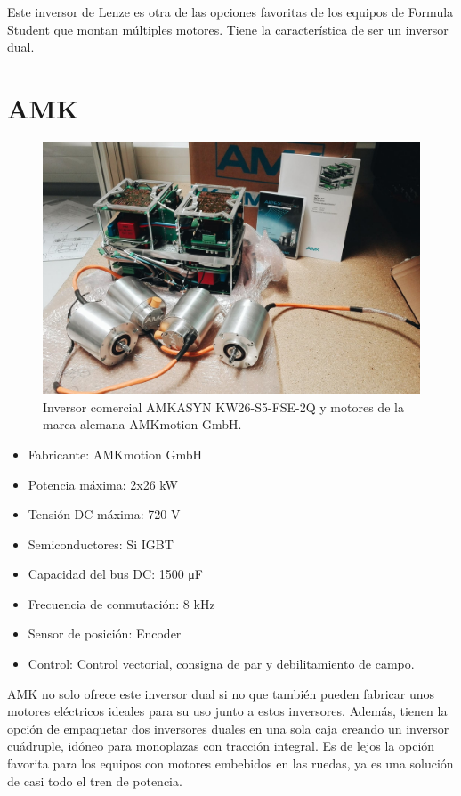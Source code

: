 Este inversor de Lenze es otra de las opciones favoritas de los equipos de Formula Student que montan múltiples motores. Tiene la característica de ser un inversor dual. 

\section{AMK}
\begin{figure}[H]
	\centering
	\includegraphics[width=0.7\linewidth]{fig/amk}
	\caption{Inversor comercial AMKASYN KW26-S5-FSE-2Q y motores de la marca alemana AMKmotion GmbH. \cite{amk_tirol}}
	\label{fig:amk}
\end{figure}

\begin{itemize}
	\item Fabricante: AMKmotion GmbH
	\item Potencia máxima: 2x26 kW
	\item Tensión DC máxima: 720 V
	\item Semiconductores: Si IGBT
	\item Capacidad del bus DC: 1500 \unit{\micro\farad}
	\item Frecuencia de conmutación: 8 kHz
	\item Sensor de posición: Encoder
	\item Control: Control vectorial, consigna de par y debilitamiento de campo.
\end{itemize}

AMK no solo ofrece este inversor dual si no que también pueden fabricar unos motores eléctricos ideales para su uso junto a estos inversores. Además, tienen la opción de empaquetar dos inversores duales en una sola caja creando un inversor cuádruple, idóneo para monoplazas con tracción integral. Es de lejos la opción favorita para los equipos con motores embebidos en las ruedas, ya es una solución de casi todo el tren de potencia.


